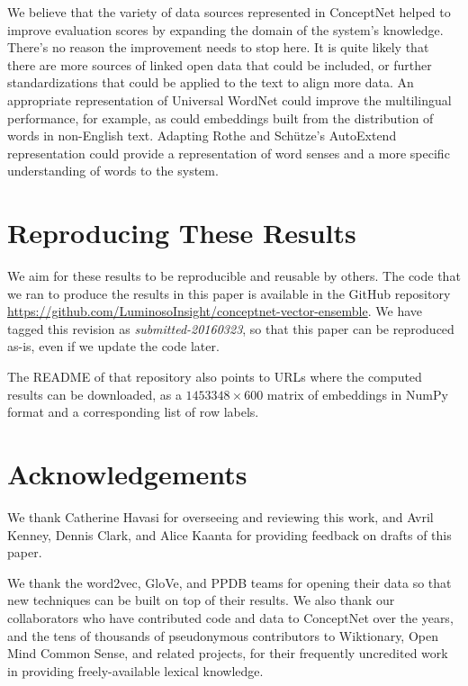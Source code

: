 \documentclass[11pt,letterpaper]{article}
\begin{document}
We believe that the variety of data sources represented in ConceptNet helped to
improve evaluation scores by expanding the domain of the system's knowledge.
There's no reason the improvement needs to stop here. It is quite likely that
there are more sources of linked open data that could be included, or further
standardizations that could be applied to the text to align more data. An
appropriate representation of Universal WordNet \cite{demelo2009uwn} could
improve the multilingual performance, for example, as could embeddings built
from the distribution of words in non-English text. Adapting Rothe and
Schütze's AutoExtend representation could provide a representation of word
senses and a more specific understanding of words to the system.

\section{Reproducing These Results}

We aim for these results to be reproducible and reusable by others. The code
that we ran to produce the results in this paper is available in the GitHub
repository \url{https://github.com/LuminosoInsight/conceptnet-vector-ensemble}.
We have tagged this revision as {\em submitted-20160323}, so that this paper
can be reproduced as-is, even if we update the code later.

The README of that repository also points to URLs where the computed results
can be downloaded, as a $1453348 \times 600$ matrix of embeddings in NumPy
format and a corresponding list of row labels.

\section*{Acknowledgements}

We thank Catherine Havasi for overseeing and reviewing this work, and Avril Kenney,
Dennis Clark, and Alice Kaanta for providing feedback on drafts of this paper.

We thank the word2vec, GloVe, and PPDB teams for opening their data so that new
techniques can be built on top of their results. We also thank our
collaborators who have contributed code and data to ConceptNet over the years,
and the tens of thousands of pseudonymous contributors to Wiktionary, Open Mind
Common Sense, and related projects, for their frequently uncredited work in
providing freely-available lexical knowledge.

\begin{CJK*}{UTF8}{min}

\end{CJK*}
\end{document}

